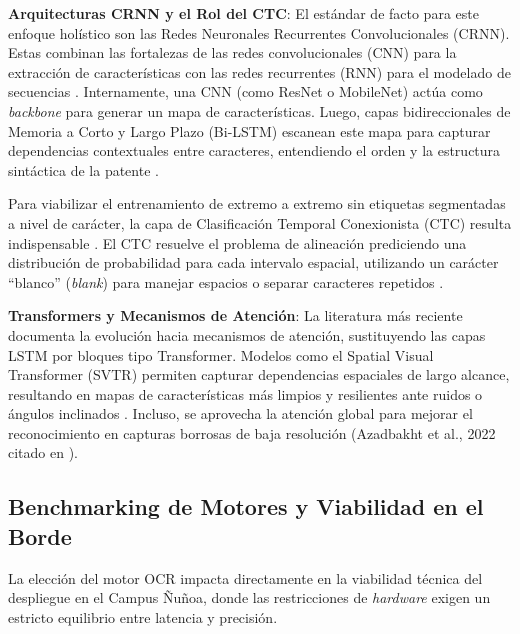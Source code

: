 \textbf{Arquitecturas CRNN y el Rol del CTC}: 
El estándar de facto para este enfoque holístico son las Redes Neuronales Recurrentes 
Convolucionales (CRNN). Estas combinan las fortalezas de las redes convolucionales (CNN) 
para la extracción de características con las redes recurrentes (RNN) para el modelado de secuencias 
\parencite{vargooraniLicensePlateDetection2024, zherzdevLPRNetLicensePlate2018}. 
Internamente, una CNN (como ResNet o MobileNet) actúa como \textit{backbone} para generar un 
mapa de características. Luego, capas bidireccionales de Memoria a Corto y Largo Plazo (Bi-LSTM) 
escanean este mapa para capturar dependencias contextuales entre caracteres, entendiendo el 
orden y la estructura sintáctica de la patente 
\parencite{kuyunsaDeepLearningEnhancedAutomatic2025, mobeenRealTimeAutomaticLicense2026, vargooraniLicensePlateDetection2024}.

Para viabilizar el entrenamiento de extremo a extremo sin etiquetas segmentadas a nivel 
de carácter, la capa de Clasificación Temporal Conexionista (CTC) resulta indispensable 
\parencite{sonnaraEfficientRealtimeLicense2025, zherzdevLPRNetLicensePlate2018}. 
El CTC resuelve el problema de alineación prediciendo una distribución de probabilidad para 
cada intervalo espacial, utilizando un carácter ``blanco'' (\textit{blank}) para manejar espacios 
o separar caracteres repetidos \parencite{mobeenRealTimeAutomaticLicense2026, sonnaraEfficientRealtimeLicense2025, zherzdevLPRNetLicensePlate2018}.

\textbf{Transformers y Mecanismos de Atención}: 
La literatura más reciente documenta la evolución hacia mecanismos de atención, sustituyendo 
las capas LSTM por bloques tipo Transformer. Modelos como el Spatial Visual Transformer (SVTR) 
permiten capturar dependencias espaciales de largo alcance, resultando en mapas de 
características más limpios y resilientes ante ruidos o ángulos inclinados 
\parencite{buleuDeepLearningBasedSystem2025a, xuDeepLearningAlgorithms2026c}. 
Incluso, se aprovecha la atención global para mejorar el reconocimiento en capturas 
borrosas de baja resolución (Azadbakht et al., 2022 citado en \cite{xiongLicensePlateRecognition2026}).

\subsection{Benchmarking de Motores y Viabilidad en el Borde}

La elección del motor OCR impacta directamente en la viabilidad técnica del despliegue en 
el Campus Ñuñoa, donde las restricciones de \textit{hardware} exigen un estricto equilibrio 
entre latencia y precisión.


